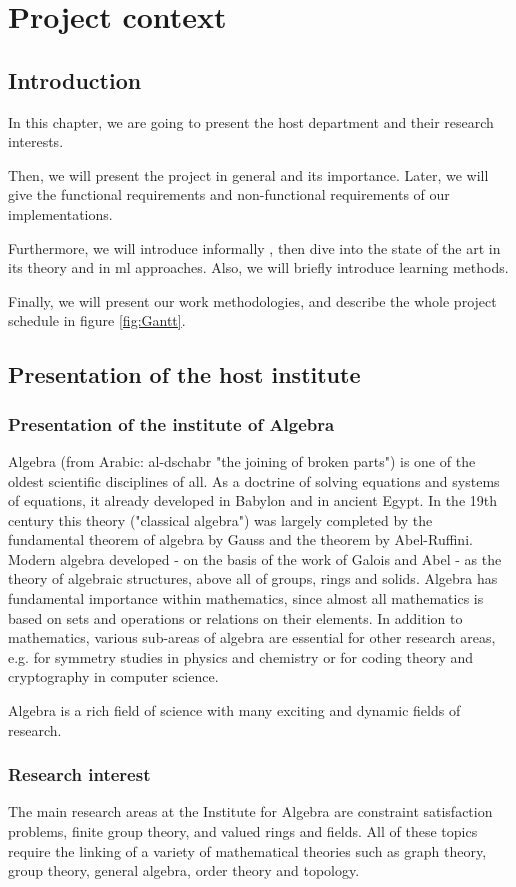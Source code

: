 \chapter{Project context}
\section*{Introduction}
In this chapter, we are going to present the host department and their research interests.

Then, we will present the project in general and its importance. Later, we will give the functional requirements and non-functional requirements of our implementations.

Furthermore, we will introduce informally , then dive into the state of the art in its theory and in \acrfull{ml} approaches. Also, we will briefly introduce learning methods.

Finally, we will present our work methodologies, and describe the whole project schedule in figure \ref{fig:Gantt}.
\section{Presentation of the host institute}
\subsection{Presentation of the institute of Algebra}
Algebra (from Arabic: al-dschabr "the joining of broken parts") is one of the oldest scientific disciplines of all. As a doctrine of solving equations and systems of equations, it already developed in Babylon and in ancient Egypt. In the 19th century this theory ("classical algebra") was largely completed by the fundamental theorem of algebra by Gauss and the theorem by Abel-Ruffini. Modern algebra developed - on the basis of the work of Galois and Abel - as the theory of algebraic structures, above all of groups, rings and solids. Algebra has fundamental importance within mathematics, since almost all mathematics is based on sets and operations or relations on their elements. In addition to mathematics, various sub-areas of algebra are essential for other research areas, e.g. for symmetry studies in physics and chemistry or for coding theory and cryptography in computer science.

Algebra is a rich field of science with many exciting and dynamic fields of research.


\subsection{Research interest}
The main research areas at the Institute for Algebra are constraint satisfaction problems, finite group theory, and valued rings and fields. All of these topics require the linking of a variety of mathematical theories such as graph theory, group theory, general algebra, order theory and topology.


